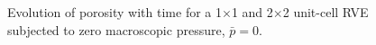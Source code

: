 \documentclass[notitlepage,a4paper,fleqn,9pt]{extarticle}
\begin{document}
\begin{multicols}{2}
\begin{figure}[H]
 \caption{Evolution of porosity with time for a 1$\times$1 and 2$\times$2 unit-cell RVE subjected to zero macroscopic pressure, $\bar{p} = 0$.}
 \label{fig:porosity}
\end{figure}

% 
% 
% 
% 
% 
% 
% 
% 

\end{multicols}
\end{document}
